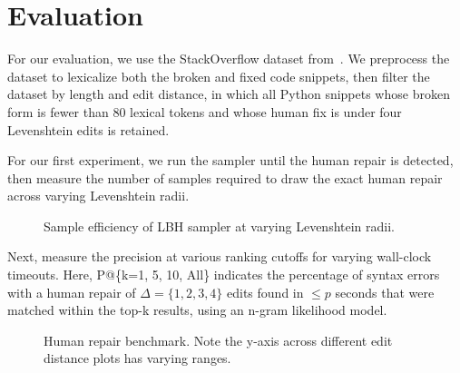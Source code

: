 \section{Evaluation}
For our evaluation, we use the StackOverflow dataset from~\cite{hindle2012naturalness}. We preprocess the dataset to lexicalize both the broken and fixed code snippets, then filter the dataset by length and edit distance, in which all Python snippets whose broken form is fewer than 80 lexical tokens and whose human fix is under four Levenshtein edits is retained.

For our first experiment, we run the sampler until the human repair is detected, then measure the number of samples required to draw the exact human repair across varying Levenshtein radii.

\begin{figure}[h!]
%  
  \caption{Sample efficiency of LBH sampler at varying Levenshtein radii.}\label{fig:sample_efficiency}
\end{figure}

Next, measure the precision at various ranking cutoffs for varying wall-clock timeouts. Here, P@\{k=1, 5, 10, All\} indicates the percentage of syntax errors with a human repair of $\Delta=\{1, 2, 3, 4\}$ edits found in $\leq p$ seconds that were matched within the top-k results, using an n-gram likelihood model.

\begin{figure}[h!]
  \resizebox{.24\textwidth}{!}{}
  \resizebox{.24\textwidth}{!}{}
  \resizebox{.24\textwidth}{!}{}
  \resizebox{.24\textwidth}{!}{}
  \caption{Human repair benchmark. Note the y-axis across different edit distance plots has varying ranges.}\label{fig:human}
\end{figure}